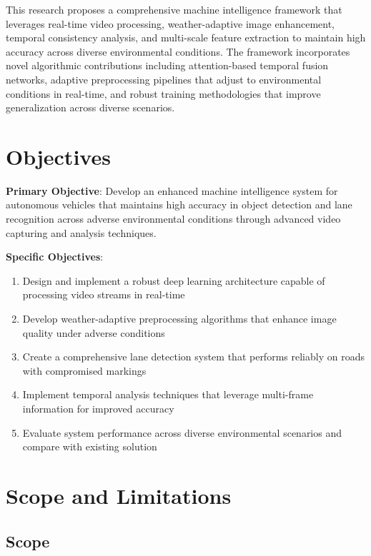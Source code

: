 This research proposes a comprehensive machine intelligence framework that leverages real-time video processing, weather-adaptive image enhancement, temporal consistency analysis, and multi-scale feature extraction to maintain high accuracy across diverse environmental conditions. The framework incorporates novel algorithmic contributions including attention-based temporal fusion networks, adaptive preprocessing pipelines that adjust to environmental conditions in real-time, and robust training methodologies that improve generalization across diverse scenarios.


\section{Objectives}
\textbf{Primary Objective}: Develop an enhanced machine intelligence system for autonomous vehicles that maintains high accuracy in object detection and lane recognition across adverse environmental conditions through advanced video capturing and analysis techniques.

\textbf{Specific Objectives}:
\begin{enumerate}
    \item Design and implement a robust deep learning architecture capable of processing video streams in real-time
    \item Develop weather-adaptive preprocessing algorithms that enhance image quality under adverse conditions
    \item Create a comprehensive lane detection system that performs reliably on roads with compromised markings
    \item Implement temporal analysis techniques that leverage multi-frame information for improved accuracy
    \item Evaluate system performance across diverse environmental scenarios and compare with existing solution
\end{enumerate}

\section{Scope and Limitations}

\subsection{Scope}

